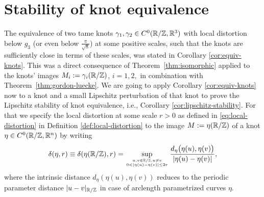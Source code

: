 \section{Stability of knot equivalence}\label{sec:stability}
The equivalence of two tame knots $\gamma_1,\gamma_2\in C^0(\mathbb{R}/\mathbb{Z},\mathbb{R}^3)$
with local distortion below $g_3$ (or even below
$\frac{\pi}{\sqrt{8}}$) at some positive scales, such that the knots 
are sufficiently close in 
terms of these scales, was stated in Corollary \ref{cor:equiv-knots}. This was a direct
consequence of Theorem~\ref{thm:isomorphic} applied to the knots' images $M_i:=
\gamma_i(\mathbb{R}/\mathbb{Z})$, $i=1,2,$ in combination with Theorem~\ref{thm:gordon-luecke}. 
We are going to apply Corollary \ref{cor:equiv-knots} now
to a knot and a small Lipschitz perturbation of that knot to
prove the Lipschitz stability of knot equivalence, i.e., 
Corollary \ref{cor:lipschitz-stability}. For that we specify the local distortion
at some scale $r>0$ as
defined in \eqref{eq:local-distortion} in Definition \ref{def:local-distortion}
to the image $M:=\eta(\mathbb{R}/\mathbb{Z})$ of a knot $\eta\in C^0(\mathbb{R}/\mathbb{Z},\mathbb{R}^n)$ by writing
\begin{equation}\label{eq:local-distortion-knots}
\delta(\eta,r)\equiv\delta(\eta(\R/\Z),r) 
=\sup_{u,v\in\R/\Z, u\not= v\atop 0<|\eta(u)-\eta(v)|\le 2r}
\frac{d_\eta\big(\eta(u),\eta(v)\big)}{|\eta(u)-\eta(v)|},
\end{equation}
where the intrinsic distance $d_\eta(\eta(u),\eta(v))$ reduces to the periodic 
parameter distance $|u-v|_{\mathbb{R}/\mathbb{Z}}$ in case of arclength parametrized curves $\eta$.


